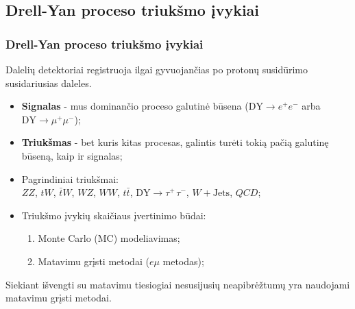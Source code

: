 \documentclass[xcolor=dvipsnames]{beamer}
\newcommand{\WJets}{\mathit{W}+\mathrm{Jets}}
\newcommand{\emu}{\mathit{e}\mu}
\begin{document}
\begin{frame}
	\subsection{Drell-Yan proceso triukšmo įvykiai}
	\frametitle{Drell-Yan proceso triukšmo įvykiai}
	Dalelių detektoriai registruoja ilgai gyvuojančias po protonų susidūrimo susidariusias daleles.

	\medskip

	\begin{itemize}
		\item \textbf{Signalas} - mus dominančio proceso galutinė būsena ($\mathrm{DY}\!\rightarrow\!\mathit{e^{+}\! e^{-}}$ arba
		$\mathrm{DY}\!\rightarrow\!\mathit{\mu^{+}\! \mu^{-}}$);
		\item \textbf{Triukšmas} - bet kuris kitas procesas, galintis turėti tokią pačią galutinę būseną, kaip ir signalas;\\[5mm]
		\item Pagrindiniai triukšmai:\\
		$\mathit{ZZ}$, $\mathit{tW}$, $\bar{\mathit{t}}\mathit{W}$, $\mathit{WZ}$, $\mathit{WW}$, $\mathit{t}\bar{\mathit{t}}$,
		$\mathrm{DY}\!\rightarrow\!\mathit{\tau^{+\,}\!\tau^{-}}$, $\WJets$, $\mathit{QCD}$;
		\item Triukšmo įvykių skaičiaus įvertinimo būdai:
		\begin{enumerate}
			\item Monte Carlo (MC) modeliavimas;
			\item Matavimu grįsti metodai ($\emu$ metodas);
		\end{enumerate}
	\end{itemize}

	\medskip

	Siekiant išvengti su matavimu tiesiogiai nesusijusių neapibrėžtumų yra naudojami matavimu grįsti metodai.
\end{frame}
\end{document}
